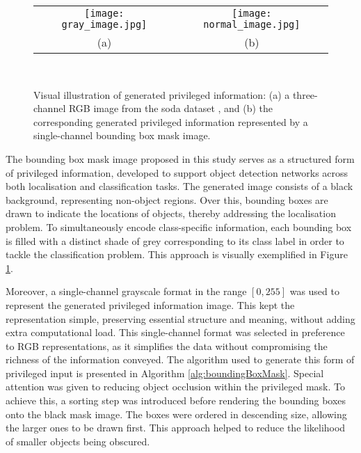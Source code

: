 \begin{figure}[!htbp]
  \centering
  \begin{tabular}{cc}
    \texttt{[image: gray\_image.jpg]} &
    \texttt{[image: normal\_image.jpg]} \\
    \small (a) & \small (b) \\
  \end{tabular}\\
  \caption{Visual illustration of generated privileged information: (a) a three-channel RGB image from the \gls{soda} dataset \cite{soda_dataset}, and (b) the corresponding generated privileged information represented by a single-channel bounding box mask image.}
  \label{fig:privileged_visual}
\end{figure}

The bounding box mask image proposed in this study serves as a structured form of privileged information, developed to support object detection networks across both localisation and classification tasks. The generated image consists of a black background, representing non-object regions. Over this, bounding boxes are drawn to indicate the locations of objects, thereby addressing the localisation problem. To simultaneously encode class-specific information, each bounding box is filled with a distinct shade of grey corresponding to its class label in order to tackle the classification problem. This approach is visually exemplified in Figure \ref{fig:privileged_visual}.

Moreover, a single-channel grayscale format in the range $[0, 255]$ was used to represent the generated privileged information image. This kept the representation simple, preserving essential structure and meaning, without adding extra computational load. This single-channel format was selected in preference to RGB representations, as it simplifies the data without compromising the richness of the information conveyed. The algorithm used to generate this form of privileged input is presented in Algorithm \ref{alg:boundingBoxMask}. Special attention was given to reducing object occlusion within the privileged mask. To achieve this, a sorting step was introduced before rendering the bounding boxes onto the black mask image. The boxes were ordered in descending size, allowing the larger ones to be drawn first. This approach helped to reduce the likelihood of smaller objects being obscured.

        
